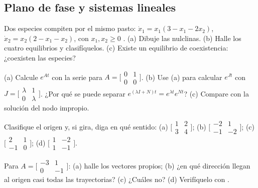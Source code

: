 \subsection*{Plano de fase y sistemas lineales}

\begin{problema}\label{prob:bi-competencia}
Dos especies compiten por el mismo pasto: $\dot x_1=x_1(3-x_1-2x_2)$, $\dot x_2=x_2(2-x_1-x_2)$, con $x_1,x_2\ge0$ \citep[\S6.4]{Str15}. (a) Dibuje las nulclinas. (b) Halle los cuatro equilibrios y clasifíquelos. (c) Existe un equilibrio de coexistencia: ¿coexisten las especies?
\end{problema}

\begin{problema}\label{prob:bi-exponencial}
(a) Calcule $e^{At}$ con la serie para $A=\bigl[\begin{smallmatrix}0&1\\0&0\end{smallmatrix}\bigr]$. (b) Use (a) para calcular $e^{Jt}$ con $J=\bigl[\begin{smallmatrix}\lambda&1\\0&\lambda\end{smallmatrix}\bigr]$. ¿Por qué se puede separar $e^{(\lambda I+N)t}=e^{\lambda t}e^{Nt}$? (c) Compare con la solución del nodo impropio.
\end{problema}

\begin{problema}[clasificar]\label{prob:bi-clasificar}
Clasifique el origen y, si gira, diga en qué sentido: (a) $\bigl[\begin{smallmatrix}1&2\\3&4\end{smallmatrix}\bigr]$; (b) $\bigl[\begin{smallmatrix}-2&1\\-1&-2\end{smallmatrix}\bigr]$; (c) $\bigl[\begin{smallmatrix}2&1\\-1&0\end{smallmatrix}\bigr]$; (d) $\bigl[\begin{smallmatrix}1&-2\\1&-1\end{smallmatrix}\bigr]$.
\end{problema}

\begin{problema}\label{prob:bi-lenta}
Para $A=\bigl[\begin{smallmatrix}-3&1\\0&-1\end{smallmatrix}\bigr]$: (a) halle los vectores propios; (b) ¿en qué dirección llegan al origen casi todas las trayectorias? (c) ¿Cuáles no? (d) \etiquetaM{} Verifíquelo con .
\end{problema}

